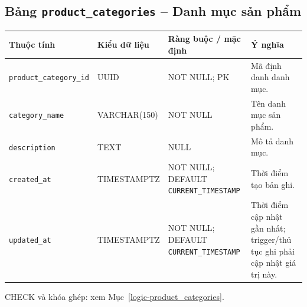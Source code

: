 \subsection{Bảng \texttt{product\_\allowbreak{}categories} -- Danh mục sản phẩm}
\label{dictionary-product_categories}
\begingroup
\footnotesize
\setlength{\tabcolsep}{3pt}
\begin{longtable}{>{\raggedright\arraybackslash}p{3.1cm}>{\raggedright\arraybackslash}p{2.5cm}>{\raggedright\arraybackslash}p{3.7cm}>{\raggedright\arraybackslash}p{4.3cm}}
\toprule
Thuộc tính & Kiểu dữ liệu & Ràng buộc / mặc định & Ý nghĩa \\
\midrule
\endhead
\texttt{product\_\allowbreak{}category\_\allowbreak{}id} & UUID & NOT NULL; PK & Mã định danh danh mục. \\
\texttt{category\_\allowbreak{}name} & VARCHAR(150) & NOT NULL & Tên danh mục sản phẩm. \\
\texttt{description} & TEXT & NULL & Mô tả danh mục. \\
\texttt{created\_\allowbreak{}at} & TIMESTAMPTZ & NOT NULL; DEFAULT \texttt{CURRENT\_\allowbreak{}TIMESTAMP} & Thời điểm tạo bản ghi. \\
\texttt{updated\_\allowbreak{}at} & TIMESTAMPTZ & NOT NULL; DEFAULT \texttt{CURRENT\_\allowbreak{}TIMESTAMP} & Thời điểm cập nhật gần nhất; trigger/thủ tục ghi phải cập nhật giá trị này. \\
\bottomrule
\end{longtable}
\endgroup
CHECK và khóa ghép: xem Mục~\ref{logic-product_categories}.
